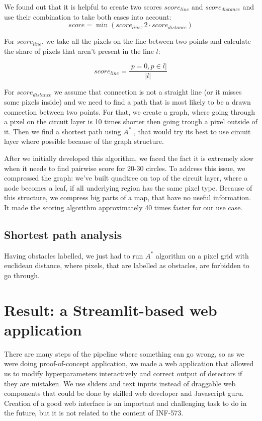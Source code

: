 \documentclass[a4paper,12pt]{extarticle}
\begin{document}
We found out that it is helpful to create two scores $score_{line}$ and $score_{distance}$ and use their combination to take both cases into account:
$$score = \min(score_{line}, 2 \cdot score_{distance})$$

For $score_{line}$, we take all the pixels on the line between two points and calculate the share of pixels that aren't present in the line $l$:

$$score_{line} = \frac{|p = 0, p \in l|}{|l|}$$

For $score_{distance}$ we assume that connection is not a straight line (or it misses some pixels inside) and we need to find a path that is most likely to be a drawn connection between two points.
For that, we create a graph, where going through a pixel on the circuit layer is 10 times shorter then going trough a pixel outside of it.
Then we find a shortest path using $A^*$ \cite{astar}, that would try its best to use circuit layer where possible because of the graph structure.

After we initially developed this algorithm, we faced the fact it is extremely slow when it needs to find pairwise score for 20-30 circles.
To address this issue, we compressed the graph: we've built quadtree \cite{quadtree} on top of the circuit layer, where a node becomes a leaf, if all underlying region has the same pixel type.
Because of this structure, we compress big parts of a map, that have no useful information.
It made the scoring algorithm approximately 40 times faster for our use case.

\subsection{Shortest path analysis}

Having obstacles labelled, we just had to run $A^*$ algorithm \cite{astar} on a pixel grid with euclidean distance, where pixels, that are labelled as obstacles, are forbidden to go through.

\section{Result: a Streamlit-based web application}

There are many steps of the pipeline where something can go wrong, so as we were doing proof-of-concept application, we made a web application that allowed us to modify hyperparameters interactively and correct output of detectors if they are mistaken.
We use sliders and text inputs instead of draggable web components that could be done by skilled web developer and Javascript guru.
Creation of a good web interface is an important and challenging task to do in the future, but it is not related to the content of INF-573.
\end{document}
